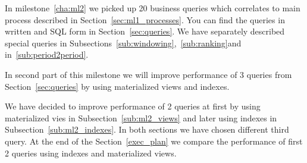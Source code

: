 
 In milestone~\ref{cha:ml2} we picked up 20 business queries which correlates to main process described in Section~\ref{sec:ml1_processes}. You can find the queries in written and SQL form in Section~\ref{sec:queries}. We have separately described special queries in Subsections~\ref{sub:windowing},~\ref{sub:ranking}and in~\ref{sub:period2period}.

 In second part of this milestone we will improve performance of 3 queries from Section~\ref{sec:queries} by using materialized views and indexes.

We have decided to improve performance of 2 queries at first by using materialized vies in Subsection~\ref{sub:ml2_views}
and later using indexes in Subsection~\ref{sub:ml2_indexes}.
In both sections we have chosen different third query.
At the end of the Section~\ref{exec_plan} we compare the performance of first 2 queries using indexes and materialized views.
 
